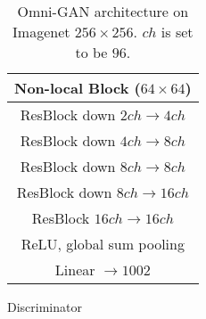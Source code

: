 \documentclass[paper_2425.tex]{subfiles}
\begin{document}
\begin{table*}[htbp]
\begin{subtable}[t]{0.48\linewidth}
{\begin{tabular}{c}
        Non-local Block ($64 \times 64$)                         \\ \midrule
        ResBlock down $2ch \rightarrow 4ch$                      \\ \midrule
        ResBlock down $4ch \rightarrow 8ch$                      \\ \midrule
        ResBlock down $8ch \rightarrow 8ch$                      \\ \midrule
        ResBlock down $8ch \rightarrow 16ch$                     \\ \midrule
        ResBlock $16ch \rightarrow 16ch$                         \\ \midrule
        ReLU, global sum pooling                                 \\ \midrule
        Linear $\rightarrow 1002$                                \\
        \bottomrule
      \end{tabular}}
    \caption{Discriminator}
  \end{subtable}
  \caption{Omni-GAN architecture on Imagenet $256\times256$. $ch$ is set to be $96$.}
  \label{apx:tab:omnigan_imagenet256}
\end{table*}
\end{document}
